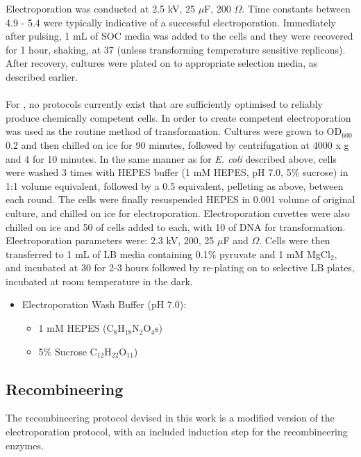 Electroporation was conducted at 2.5 kV, 25 $\mu$F, 200 $\Omega$. Time constants between 4.9 - 5.4 were typically indicative of a successful electroporation. Immediately after pulsing, 1 mL of SOC media was added to the cells and they were recovered for 1 hour, shaking, at 37\degC{} (unless transforming temperature sensitive replicons). After recovery, cultures were plated on to appropriate selection media, as described earlier.


\paragraph{\Pa}
For \Pa, no protocols currently exist that are sufficiently optimised to reliably produce chemically competent cells. In order to create competent \Pa{} electroporation was used as the routine method of transformation. Cultures were grown to OD$_{600}$ 0.2 and then chilled on ice for 90 minutes, followed by centrifugation at 4000 x g and 4\degC{} for 10 minutes. In the same manner as for \emph{E. coli} described above, cells were washed 3 times with HEPES buffer (1 mM HEPES, pH 7.0, 5\% sucrose) in 1:1 volume equivalent, followed by a 0.5 equivalent, pelleting as above, between each round. The cells were finally resuspended HEPES in 0.001 volume of original culture, and chilled on ice for electroporation. Electroporation cuvettes were also chilled on ice and 50\ul{} of cells added to each, with 10\ul{} of DNA for transformation. Electroporation parameters were: 2.3 kV, 200, 25 $\mu$F and $\Omega$. Cells were then transferred to 1 mL of LB media containing 0.1\% pyruvate and 1 mM MgCl$_2$, and incubated at 30\degC{} for 2-3 hours followed by re-plating on to selective LB plates, incubated at room temperature in the dark.

		\small
		\begin{itemize}
		\item \Pa{} Electroporation Wash Buffer (pH 7.0):
			\begin{itemize}
			\item 1 mM HEPES ($\mathrm{C}_{8}\mathrm{H}_{18}\mathrm{N}_{2}\mathrm{O}_{4}\mathrm{s}$)
			\item 5\% Sucrose $\mathrm{C}_{12}\mathrm{H}_{22}\mathrm{O}_{11}$)
			\end{itemize}
		\end{itemize}
		\normalsize
	


\subsection{Recombineering}\label{recombineering}
The recombineering protocol devised in this work is a modified version of the electroporation protocol, with an included induction step for the recombineering enzymes.

